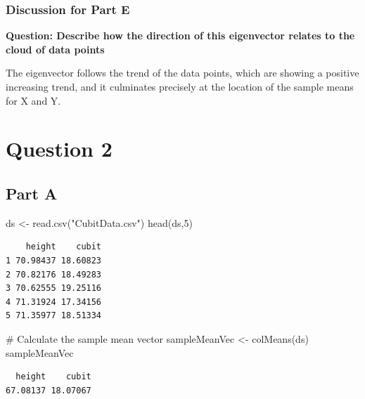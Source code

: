 \documentclass[
  letterpaper,
  DIV=11,
  numbers=noendperiod]{scrartcl}
\newenvironment{Shaded}{}{}
\newcommand{\CommentTok}[1]{\textcolor[rgb]{0.57,0.51,0.45}{#1}}
\newcommand{\DecValTok}[1]{\textcolor[rgb]{0.96,0.45,0.00}{#1}}
\newcommand{\FunctionTok}[1]{\textcolor[rgb]{0.41,0.62,0.42}{#1}}
\newcommand{\NormalTok}[1]{\textcolor[rgb]{0.24,0.22,0.21}{#1}}
\newcommand{\OtherTok}[1]{\textcolor[rgb]{0.41,0.62,0.42}{#1}}
\newcommand{\StringTok}[1]{\textcolor[rgb]{0.60,0.59,0.10}{#1}}
\begin{document}
\hypertarget{discussion-for-part-e}{%
\subsubsection{Discussion for Part E}\label{discussion-for-part-e}}

\textbf{Question: Describe how the direction of this eigenvector relates
to the cloud of data points}

The eigenvector follows the trend of the data points, which are showing
a positive increasing trend, and it culminates precisely at the location
of the sample means for X and Y.

\newpage{}

\hypertarget{question-2}{%
\section{Question 2}\label{question-2}}

\hypertarget{part-a-1}{%
\subsection{Part A}\label{part-a-1}}

\begin{Shaded}
\begin{Highlighting}[]
\NormalTok{ds }\OtherTok{\textless{}{-}} \FunctionTok{read.csv}\NormalTok{(}\StringTok{"CubitData.csv"}\NormalTok{)}
\FunctionTok{head}\NormalTok{(ds,}\DecValTok{5}\NormalTok{)}
\end{Highlighting}
\end{Shaded}

\begin{verbatim}
    height    cubit
1 70.98437 18.60823
2 70.82176 18.49283
3 70.62555 19.25116
4 71.31924 17.34156
5 71.35977 18.51334
\end{verbatim}

\begin{Shaded}
\begin{Highlighting}[]
\CommentTok{\# Calculate the sample mean vector}
\NormalTok{sampleMeanVec }\OtherTok{\textless{}{-}} \FunctionTok{colMeans}\NormalTok{(ds)}
\NormalTok{sampleMeanVec}
\end{Highlighting}
\end{Shaded}

\begin{verbatim}
  height    cubit 
67.08137 18.07067 
\end{verbatim}
\end{document}
